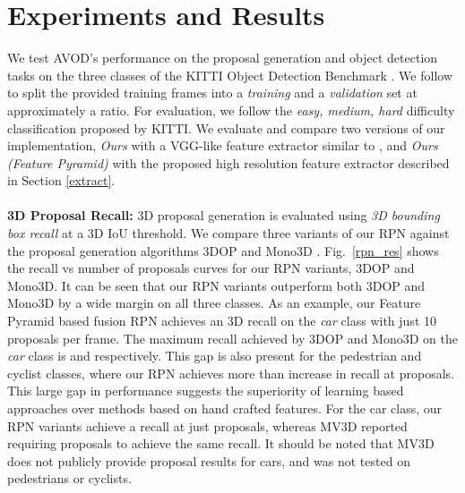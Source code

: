 \documentclass[letterpaper, 10 pt, conference]{ieeeconf}
\newcommand{\fig}[1]{Fig.~\ref{#1}}
\begin{document}
\section{Experiments and Results}
\label{exp}
We test AVOD's performance on the proposal generation and object detection tasks on the three classes of the KITTI Object Detection Benchmark \cite{geiger2012we}. We follow \cite{cvpr17chen} to split the provided  training frames into a \textit{training} and a \textit{validation} set at approximately a  ratio. For evaluation, we follow the \textit{easy, medium, hard} difficulty classification proposed by KITTI. We evaluate and compare two versions of our implementation, \textit{Ours} with a VGG-like feature extractor similar to \cite{cvpr17chen}, and \textit{Ours (Feature Pyramid)} with the proposed  high resolution feature extractor described in Section \ref{extract}.
\\
\\
\textbf{3D Proposal Recall:}
3D proposal generation is evaluated using \textit{3D bounding box recall} at a  3D IoU threshold. We compare three variants of our RPN against the proposal generation algorithms 3DOP \cite{nips15chen} and Mono3D \cite{cvpr16chen}. \fig{rpn_res} shows the recall vs number of proposals curves for our RPN variants, 3DOP and Mono3D. It can be seen that our RPN variants outperform both 3DOP and Mono3D by a wide margin on all three classes. As an example, our Feature Pyramid based fusion RPN achieves an \textbf{} 3D recall on the \textit{car} class with just 10 proposals per frame. The maximum recall achieved by 3DOP and Mono3D on the \textit{car} class is  and  respectively. This gap is also present for the pedestrian and cyclist classes, where our RPN achieves more than  increase in recall at  proposals. This large gap in performance suggests the superiority of learning based approaches over methods based on hand crafted features. For the car class, our RPN variants achieve a  recall at just  proposals, whereas MV3D \cite{cvpr17chen} reported requiring  proposals to achieve the same recall. It should be noted that MV3D does not publicly provide proposal results for cars, and was not tested on pedestrians or cyclists.
\\
\end{document}
